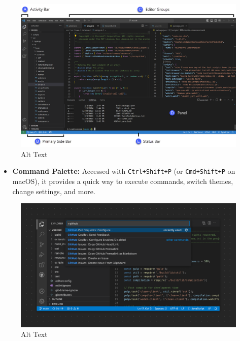 \documentclass[
  letterpaper,
  DIV=11,
  numbers=noendperiod]{scrreprt}
\providecommand{\tightlist}{%
  \setlength{\itemsep}{0pt}\setlength{\parskip}{0pt}}\usepackage{longtable,booktabs,array}
\begin{document}
\begin{figure}

{\centering \includegraphics{images/vscode_interface.png}

}

\caption{Alt Text}

\end{figure}

\begin{itemize}
\tightlist
\item
  \textbf{Command Palette:} Accessed with \texttt{Ctrl+Shift+P} (or
  \texttt{Cmd+Shift+P} on macOS), it provides a quick way to execute
  commands, switch themes, change settings, and more.
\end{itemize}

\begin{figure}

{\centering \includegraphics{images/command-palette.png}

}

\caption{Alt Text}

\end{figure}
\end{document}
